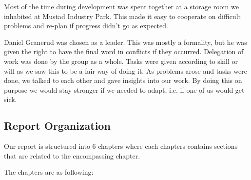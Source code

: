 Most of the time during development was spent together at a storage room we
inhabited at Mustad Industry Park. This made it easy to cooperate on difficult
problems and re-plan if progress didn't go as expected.

Daniel Granerud was chosen as a leader. This was mostly a formality, but he was
given the right to have the final word in conflicts if they occurred.
Delegation of work was done by the group as a whole. Tasks were given according
to skill or will as we saw this to be a fair way of doing it. As problems
arose and tasks were done, we talked to each other and gave insights into our
work. By doing this on purpose we would stay stronger if we needed to adapt,
i.e. if one of us would get sick.


\subsection{Report Organization}
\label{subsec:report_organization}

Our report is structured into 6 chapters where each chapters contains sections that are related to the encompassing chapter.

The chapters are as following:

